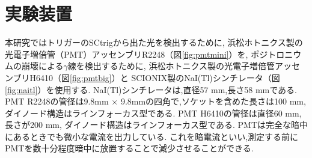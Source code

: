 \section{実験装置}

本研究ではトリガーのSCtrigから出た光を検出するために,
浜松ホトニクス製の光電子増倍管（PMT）アッセンブリR2248（図\ref{fig:pmtmini}）を,
ポジトロニウムの崩壊による$\gamma$線を検出するために,
浜松ホトニクス製の光電子増倍管アッセンブリH6410（図\ref{fig:pmtbig}）と
SCIONIX製のNaI(Tl)シンチレータ（図\ref{fig:naitl}）を使用する.
NaI(Tl)シンチレータは,直径57 mm,長さ58 mmである.
PMT R2248の管径は9.8mm $\times$ 9.8mmの四角で,ソケットを含めた長さは100 mm,
ダイノード構造はラインフォーカス型である.
PMT H6410の管径は直径60 mm,長さが200 mm,
ダイノード構造はラインフォーカス型である.
PMTは完全な暗中にあるときでも微小な電流を出力している.
これを暗電流といい,測定する前にPMTを数十分程度暗中に放置することで減少させることができる.

